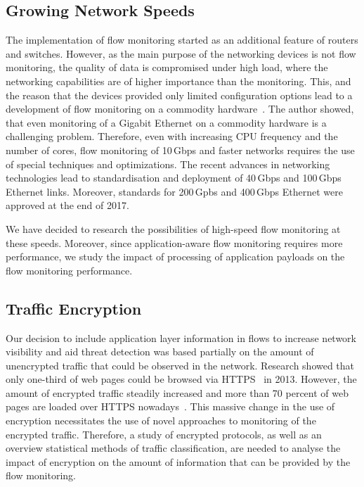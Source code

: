 \subsection{Growing Network Speeds}

The implementation of flow monitoring started as an additional feature of routers and switches. However, as the main purpose of the networking devices is not flow monitoring, the quality of data is compromised under high load, where the networking capabilities are of higher importance than the monitoring. This, and the reason that the devices provided only limited configuration options lead to a development of flow monitoring on a commodity hardware~\cite{Deri-2003-Passively}. The author showed, that even monitoring of a Gigabit Ethernet on a commodity hardware is a challenging problem. Therefore, even with increasing CPU frequency and the number of cores, flow monitoring of 10\,Gbps and faster networks requires the use of special techniques and optimizations. The recent advances in networking technologies lead to standardisation and deployment of 40\,Gbps and 100\,Gbps Ethernet links. Moreover, standards for 200\,Gpbs and 400\,Gbps Ethernet were approved at the end of 2017.

We have decided to research the possibilities of high-speed flow monitoring at these speeds. Moreover, since application-aware flow monitoring requires more performance, we study the impact of processing of application payloads on the flow monitoring performance.
\subsection{Traffic Encryption}

Our decision to include application layer information in flows to increase network visibility and aid threat detection was based partially on the amount of unencrypted traffic that could be observed in the network. Research showed that only one-third of web pages could be browsed via HTTPS~\cite{Vratonjic-2013-Inconvenient} in 2013. However, the amount of encrypted traffic steadily increased and more than 70 percent of web pages are loaded over HTTPS nowadays~\cite{ISRG-2018-Lets}. This massive change in the use of encryption necessitates the use of novel approaches to monitoring of the encrypted traffic. Therefore, a study of encrypted protocols, as well as an overview statistical methods of traffic classification, are needed to analyse the impact of encryption on the amount of information that can be provided by the flow monitoring.

